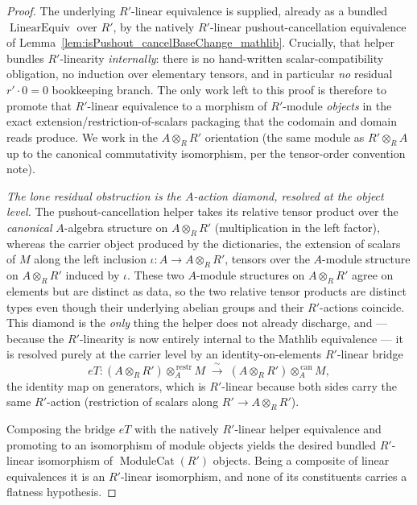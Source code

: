 \begin{proof}
  The underlying \(R'\)-linear equivalence is supplied, already as a bundled
  \(\operatorname{LinearEquiv}\) over \(R'\), by the natively \(R'\)-linear
  pushout-cancellation equivalence of
  Lemma~\ref{lem:isPushout_cancelBaseChange_mathlib}. Crucially, that helper bundles
  \(R'\)-linearity \emph{internally}: there is no hand-written scalar-compatibility
  obligation, no induction over elementary tensors, and in particular \emph{no} residual
  \(r' \cdot 0 = 0\) bookkeeping branch. The only work left to this proof is therefore to
  promote that \(R'\)-linear equivalence to a morphism of \(R'\)-module \emph{objects} in
  the exact extension/restriction-of-scalars packaging that the codomain and domain reads
  produce. We work in the \(A \otimes_R R'\) orientation
  (the same module as \(R' \otimes_R A\) up to the canonical commutativity isomorphism,
  per the tensor-order convention note).

  \emph{The lone residual obstruction is the \(A\)-action diamond, resolved at the object
  level.} The pushout-cancellation helper takes its relative tensor product over the
  \emph{canonical} \(A\)-algebra structure on \(A \otimes_R R'\)
  (multiplication in the left factor), whereas the carrier object produced by the
  dictionaries,
  the extension of scalars of \(M\) along the left inclusion \(\iota : A \to A \otimes_R R'\),
  tensors over the \(A\)-module structure on \(A \otimes_R R'\) induced by \(\iota\). These
  two \(A\)-module structures on
  \(A \otimes_R R'\) agree on elements but are distinct as data, so the two relative
  tensor products are distinct types even though their underlying abelian groups and
  their \(R'\)-actions coincide. This diamond is the \emph{only} thing the helper does
  not already discharge, and — because the \(R'\)-linearity is now entirely internal to
  the Mathlib equivalence — it is resolved purely at the carrier level by an
  identity-on-elements \(R'\)-linear bridge
  \[
    eT : (A \otimes_R R') \otimes_A^{\,\operatorname{restr}} M
    \;\xrightarrow{\ \sim\ }\;
    (A \otimes_R R') \otimes_A^{\,\mathrm{can}} M ,
  \]
  the identity map on generators, which is \(R'\)-linear because both sides carry the
  same \(R'\)-action (restriction of scalars along \(R' \to A \otimes_R R'\)).

  Composing the bridge \(eT\) with the natively \(R'\)-linear helper equivalence and
  promoting to an isomorphism of module objects yields the desired bundled
  \(R'\)-linear isomorphism of \(\operatorname{ModuleCat}(R')\) objects. Being a composite
  of linear equivalences it is an \(R'\)-linear isomorphism, and none of its constituents
  carries a flatness hypothesis.
\end{proof}

